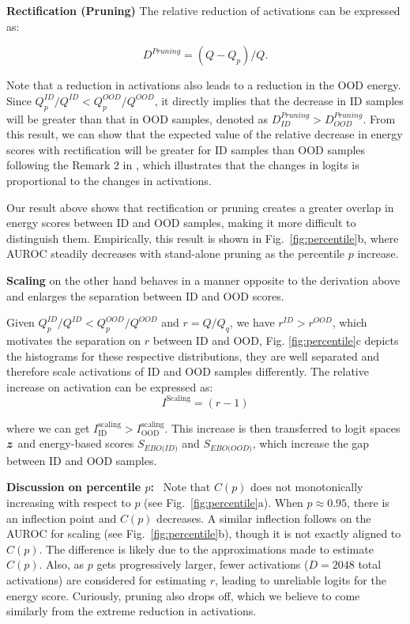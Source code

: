 \documentclass{article} %
\theoremstyle{plain}
\newcommand{\logit}{\vz}  %
\begin{document}
\textbf{Rectification (Pruning)} 
The relative reduction of activations can be expressed as:

\begin{equation}
    D^\textit{Pruning} = (Q - Q_p)/{Q}.
\end{equation}

Note that a reduction in activations also leads to a reduction in the OOD energy. 
Since ${Q_p^{\textit{ID}}}/{Q^{\textit{ID}}}<{Q_p^{\textit{OOD}}}/{Q^{\textit{OOD}}}$, it directly implies that the decrease in ID samples will be greater than that in OOD samples, denoted as $D^\textit{Pruning}_{\textit{ID}}>D^\textit{Pruning}_{\textit{OOD}}$.
From this result, we can show that the expected value of the relative decrease in energy scores with rectification will be greater for ID samples than OOD samples following the Remark 2 in \cite{DBLP:conf/nips/SunGL21/ReAct}, which illustrates that the changes in logits is 
proportional to the changes in activations.  

Our result above shows that rectification or pruning creates a greater overlap in energy scores between ID and OOD samples, making it more difficult to distinguish them.  
Empirically, this result is shown in Fig.~\ref{fig:percentile}b, where AUROC steadily decreases with stand-alone pruning as the percentile $p$ increase. 



\textbf{Scaling} on the other hand behaves in a manner opposite to the derivation above and enlarges the separation between ID and OOD scores. 


Given ${Q_p^{\textit{ID}}}/{Q^{\textit{ID}}}<{Q_p^{\textit{OOD}}}/{Q^{\textit{OOD}}}$ and $r = Q/Q_q$, we have $r^\textit{ID} > r^\textit{OOD}$, which motivates the separation on $r$ between ID and OOD, Fig. \ref{fig:percentile}c depicts the histograms for these respective distributions, they are well separated and therefore scale activations of ID and OOD samples differently. The relative increase on activation can be expressed as:
\begin{equation}
    I^\text{Scaling} = (r - 1)
\end{equation}

where we can get $I^\text{scaling}_\text{ID} > I^\text{scaling}_\text{OOD}$. This increase is then transferred to logit spaces $\logit$ and energy-based scores $S_\textit{EBO(ID)}$ and $S_\textit{EBO(OOD)}$, which increase the gap between ID and OOD samples.


\textbf{Discussion on percentile $p$:} \ Note that $C(p)$ does not monotonically increasing with respect to $p$ (see Fig.~\ref{fig:percentile}a).  When $p \approx 0.95$, there is an inflection point and $C(p)$ decreases. A similar inflection follows on the AUROC for scaling (see Fig.~\ref{fig:percentile}b), though it is not exactly aligned to $C(p)$.  The difference is likely due to the approximations made to estimate $C(p)$.  Also, as $p$ gets progressively larger, fewer activations ($D=2048$ total activations) are considered for estimating $r$, leading to unreliable logits for the energy score.  Curiously, pruning also drops off, which we believe to come similarly from the extreme reduction in activations.
\end{document}
